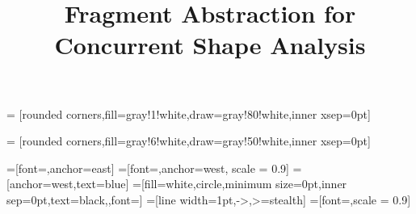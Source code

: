 \title{Fragment Abstraction for Concurrent Shape Analysis}
\author{}



\usepackage{array}
\usepackage{dsfont,stmaryrd,listings,todonotes,color,pifont,stmaryrd,wrapfig,listings,verbatim,fancyvrb,textcomp,bbm}
\usepackage[ruled,noend,nofillcomment,linesnumbered]{algorithm2e}


\usepackage{pgf}
\usepackage{tikz}
\usepackage{mdframed}
\usepackage{caption}
\usepackage{paralist}
\usepackage{todonotes}
\usepackage{url}
\usepackage{wrapfig}
\usepackage{multirow}
\usepackage{times}
\usepackage{listings}
\lstset{language=C,numberstyle=\footnotesize,
basicstyle=\ttfamily\footnotesize
}


\usetikzlibrary{automata,positioning}
\usetikzlibrary{trees}
\usetikzlibrary{shapes}
\usetikzlibrary{petri}
\usetikzlibrary{arrows}
\usetikzlibrary{backgrounds}
\usetikzlibrary{calc}
\usetikzlibrary{fit}
\usetikzlibrary{decorations.pathmorphing}
\usetikzlibrary{decorations.text}
\usetikzlibrary{shapes.callouts}





=
[rounded corners,fill=gray!1!white,draw=gray!80!white,inner xsep=0pt]%


=
[rounded corners,fill=gray!6!white,draw=gray!50!white,inner xsep=0pt]%

  
=[font={\footnotesize\tt},anchor=east]
=[font={\footnotesize\tt},anchor=west, scale = 0.9]
=[anchor=west,text=blue]
=[fill=white,circle,minimum size=0pt,inner sep=0pt,text=black,,font=\tiny]
=[line width=1pt,->,>=stealth]
=[font=\small,scale = 0.9]









